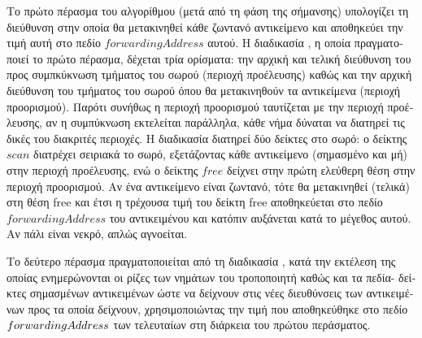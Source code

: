 \begin{greek}
Το πρώτο πέρασμα του αλγορίθμου (μετά από τη φάση της σήμανσης) υπολογίζει τη διεύθυνση 
στην οποία θα μετακινηθεί κάθε ζωντανό αντικείμενο και αποθηκεύει την τιμή αυτή στο πεδίο 
$forwardingAddress$ αυτού. Η διαδικασία , η οποία πραγματοποιεί 
το πρώτο πέρασμα, δέχεται τρία ορίσματα: την αρχική και τελική διεύθυνση του προς 
συμπκύκνωση τμήματος του σωρού (περιοχή προέλευσης) καθώς και την αρχική διεύθυνση του 
τμήματος του σωρού όπου θα μετακινηθούν τα αντικείμενα (περιοχή προορισμού). Παρότι συνήθως 
η περιοχή προορισμού ταυτίζεται με την περιοχή προέλευσης, αν η συμπύκνωση εκτελείται 
παράλληλα, κάθε νήμα δύναται να διατηρεί τις δικές του διακριτές περιοχές. Η διαδικασία 
 διατηρεί δύο δείκτες στο σωρό: ο δείκτης $scan$ διατρέχει 
σειριακά το σωρό, εξετάζοντας κάθε αντικείμενο (σημασμένο και μή) στην περιοχή προέλευσης, 
ενώ ο δείκτης $free$ δείχνει στην πρώτη ελεύθερη θέση στην περιοχή προορισμού. Αν ένα 
αντικείμενο είναι ζωντανό, τότε θα μετακινηθεί (τελικά) στη θέση free και έτσι η τρέχουσα
τιμή του δείκτη free αποθηκεύεται στο πεδίο $forwardingAddress$ του αντικειμένου και κατόπιν 
αυξάνεται κατά το μέγεθος αυτού. Αν πάλι είναι νεκρό, απλώς αγνοείται.

Το δεύτερο πέρασμα πραγματοποιείται από τη διαδικασία , κατά την 
εκτέλεση της οποίας ενημερώνονται οι ρίζες των νημάτων του τροποποιητή καθώς και τα πεδία-
δείκτες σημασμένων αντικειμένων ώστε να δείχνουν στις νέες διευθύνσεις των αντικειμένων προς 
τα οποία δείχνουν, χρησιμοποιώντας την τιμή που αποθηκεύθηκε στο πεδίο $forwarding\-Address$ 
των τελευταίων στη διάρκεια του πρώτου περάσματος. 


\end{greek}
